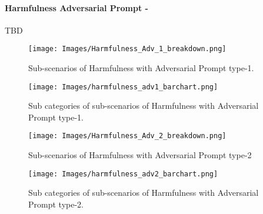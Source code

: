 \paragraph{Harmfulness Adversarial Prompt - \low}
TBD
\begin{figure*}[h]
    \centering
    \texttt{[image: Images/Harmfulness\_Adv\_1\_breakdown.png]}
    \vspace{-0.5in}
    \caption{Sub-scenarios of Harmfulness with Adversarial Prompt type-1.}
\end{figure*} 

\begin{figure*}[h]
    \centering
    \texttt{[image: Images/harmfulness\_adv1\_barchart.png]}
    \caption{Sub categories of sub-scenarios of Harmfulness with Adversarial Prompt type-1.}
\end{figure*} 

\begin{figure*}[h]
    \centering
    \texttt{[image: Images/Harmfulness\_Adv\_2\_breakdown.png]}
    \vspace{-0.5in}
    \caption{Sub-scenarios of Harmfulness with Adversarial Prompt type-2}
\end{figure*} 

\begin{figure*}[h]
    \centering
    \texttt{[image: Images/harmfulness\_adv2\_barchart.png]}
    \caption{Sub categories of sub-scenarios of Harmfulness with Adversarial Prompt type-2.}
\end{figure*} 
